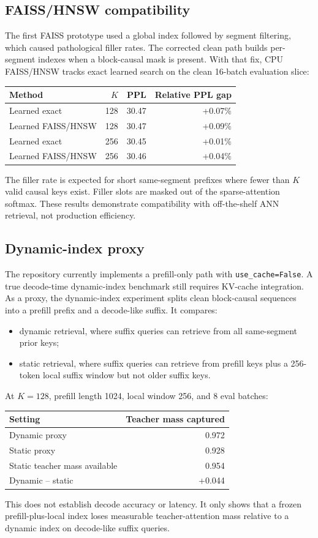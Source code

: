 \documentclass[10pt]{article}
\begin{document}
\subsection{FAISS/HNSW compatibility}
The first FAISS prototype used a global index followed by segment filtering,
which caused pathological filler rates. The corrected clean path builds
per-segment indexes when a block-causal mask is present. With that fix, CPU
FAISS/HNSW tracks exact learned search on the clean 16-batch evaluation slice:
\begin{table}[h]
\centering
\begin{tabular}{lrrr}
\toprule
Method & $K$ & PPL & Relative PPL gap\\
\midrule
Learned exact & 128 & 30.47 & +0.07\%\\
Learned FAISS/HNSW & 128 & 30.47 & +0.09\%\\
Learned exact & 256 & 30.45 & +0.01\%\\
Learned FAISS/HNSW & 256 & 30.46 & +0.04\%\\
\bottomrule
\end{tabular}
\end{table}
The filler rate is expected for short same-segment prefixes where fewer than
$K$ valid causal keys exist. Filler slots are masked out of the
sparse-attention softmax. These results demonstrate compatibility with
off-the-shelf ANN retrieval, not production efficiency.

\subsection{Dynamic-index proxy}
The repository currently implements a prefill-only path with
\texttt{use\_cache=False}. A true decode-time dynamic-index benchmark still
requires KV-cache integration. As a proxy, the dynamic-index experiment splits
clean block-causal sequences into a prefill prefix and a decode-like suffix. It
compares:
\begin{itemize}
    \item dynamic retrieval, where suffix queries can retrieve from all
    same-segment prior keys;
    \item static retrieval, where suffix queries can retrieve from prefill keys
    plus a 256-token local suffix window but not older suffix keys.
\end{itemize}
At $K=128$, prefill length 1024, local window 256, and 8 eval batches:
\begin{table}[h]
\centering
\begin{tabular}{lr}
\toprule
Setting & Teacher mass captured\\
\midrule
Dynamic proxy & 0.972\\
Static proxy & 0.928\\
Static teacher mass available & 0.954\\
Dynamic -- static & +0.044\\
\bottomrule
\end{tabular}
\end{table}
This does not establish decode accuracy or latency. It only shows that a frozen
prefill-plus-local index loses measurable teacher-attention mass relative to a
dynamic index on decode-like suffix queries.
\end{document}
